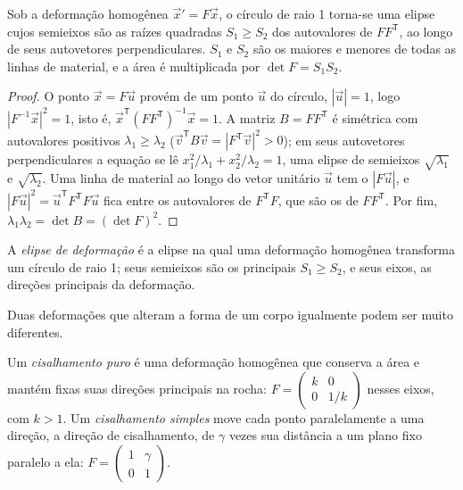 \begin{proposition}\label{prop:b1:stress-strain-rheology:ellipse}
Sob a deformação homogênea $\vec x' = F\vec x$, o círculo de raio 1 torna-se uma elipse cujos semieixos são as raízes quadradas $S_1 \ge S_2$ dos autovalores de $FF^{\mathsf T}$, ao longo de seus autovetores perpendiculares. $S_1$ e $S_2$ são os maiores e menores  de todas as linhas de material, e a área é multiplicada por $\det F = S_1S_2$.
\end{proposition}

\begin{proof}
O ponto $\vec x = F\vec u$ provém de um ponto $\vec u$ do círculo, $|\vec u| = 1$, logo $|F^{-1}\vec x|^2 = 1$, isto é, $\vec x^{\mathsf T}(FF^{\mathsf T})^{-1}\vec x = 1$. A matriz $B = FF^{\mathsf T}$ é simétrica com autovalores positivos $\lambda_1 \ge
\lambda_2$ ($\vec v^{\mathsf T}B\vec v = |F^{\mathsf T}\vec v|^2 > 0$); em seus autovetores perpendiculares a equação se lê $x_1^2/\lambda_1 + x_2^2/\lambda_2 = 1$, uma elipse de semieixos $\sqrt{\lambda_1}$ e $\sqrt{\lambda_2}$. Uma linha de material ao longo do vetor unitário $\vec u$ tem o  $|F\vec u|$, e $|F\vec u|^2 = \vec u^{\mathsf T}F^{\mathsf T}F\vec u$ fica entre os autovalores de $F^{\mathsf T}F$, que são os de $FF^{\mathsf T}$. Por fim, $\lambda_1\lambda_2 = \det B = (\det F)^2$.
\end{proof}

\begin{definition}\label{def:b1:stress-strain-rheology:strain-ellipse}
A \emph{elipse de deformação} é a elipse na qual uma deformação homogênea transforma um círculo de raio 1; seus semieixos são os  principais $S_1 \ge S_2$, e seus eixos, as direções principais da deformação.
\end{definition}

Duas deformações que alteram a forma de um corpo igualmente podem ser muito diferentes.

\begin{definition}\label{def:b1:stress-strain-rheology:shear-types}
Um \emph{cisalhamento puro} é uma deformação homogênea que conserva a área e mantém fixas suas direções principais na rocha: $F = \begin{pmatrix} k & 0 \\ 0 & 1/k\end{pmatrix}$ nesses eixos, com $k > 1$. Um \emph{cisalhamento simples} move cada ponto paralelamente a uma direção, a direção de cisalhamento, de $\gamma$ vezes sua distância a um plano fixo paralelo a ela: $F = \begin{pmatrix} 1 & \gamma \\ 0 & 1\end{pmatrix}$.
\end{definition}

